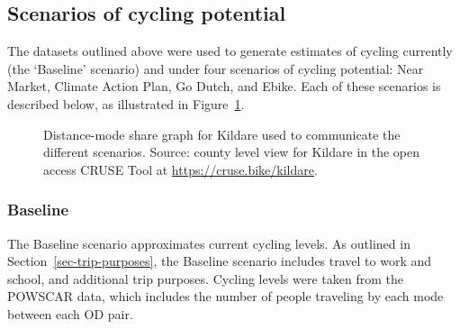 \documentclass[
  super,
  preprint,
  3p]{elsarticle}
\begin{document}
\subsection{Scenarios of cycling potential}\label{sec-scenarios}

The datasets outlined above were used to generate estimates of cycling
currently (the `Baseline' scenario) and under four scenarios of cycling
potential: Near Market, Climate Action Plan, Go Dutch, and Ebike. Each
of these scenarios is described below, as illustrated in
Figure~\ref{fig-scenarios}.

\begin{figure}


\caption{\label{fig-scenarios}Distance-mode share graph for Kildare used
to communicate the different scenarios. Source: county level view for
Kildare in the open access CRUSE Tool at
\url{https://cruse.bike/kildare}.}

\end{figure}%

\subsubsection{Baseline}\label{baseline}

The Baseline scenario approximates current cycling levels. As outlined
in Section~\ref{sec-trip-purposes}, the Baseline scenario includes
travel to work and school, and additional trip purposes. Cycling levels
were taken from the POWSCAR data, which includes the number of people
traveling by each mode between each OD pair.
\end{document}
